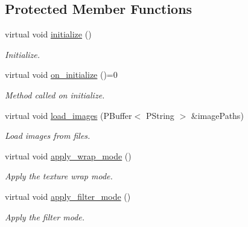 \subsection*{Protected Member Functions}
\begin{DoxyCompactItemize}
\item 
virtual void \mbox{\hyperlink{classprz_1_1_texture_ac30711bd35724f1044cbdbf4644d1df1}{initialize}} ()
\begin{DoxyCompactList}\small\item\em Initialize. \end{DoxyCompactList}\item 
virtual void \mbox{\hyperlink{classprz_1_1_texture_a75b9d1ba9920727d99e4c167c900fa32}{on\+\_\+initialize}} ()=0
\begin{DoxyCompactList}\small\item\em Method called on initialize. \end{DoxyCompactList}\item 
virtual void \mbox{\hyperlink{classprz_1_1_texture_a0687ed315cff544d82e748621b75bf19}{load\+\_\+images}} (P\+Buffer$<$ P\+String $>$ \&image\+Paths)
\begin{DoxyCompactList}\small\item\em Load images from files. \end{DoxyCompactList}\item 
virtual void \mbox{\hyperlink{classprz_1_1_texture_ad68b4a5a4032f74d3ea719f26f78b202}{apply\+\_\+wrap\+\_\+mode}} ()
\begin{DoxyCompactList}\small\item\em Apply the texture wrap mode. \end{DoxyCompactList}\item 
virtual void \mbox{\hyperlink{classprz_1_1_texture_a1383c86fed1a6d297e0b24e5a2c6c29b}{apply\+\_\+filter\+\_\+mode}} ()
\begin{DoxyCompactList}\small\item\em Apply the filter mode. \end{DoxyCompactList}\end{DoxyCompactItemize}
